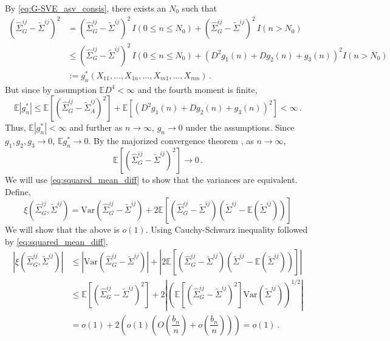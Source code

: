 \documentclass[11pt]{article}
\newcommand{\E}{\mathbb{E}}
\newcommand{\Var}{\text{Var}}
\theoremstyle{remark}
\begin{document}
By \eqref{eq:G-SVE_asv_consis}, there exists an $N_0$ such that
\begin{align*}
\left(\hat{\Sigma}_{G}^{ij} - \tilde{\Sigma}^{ij} \right)^2 &= \left(\hat{\Sigma}_{G}^{ij} - \tilde{\Sigma}^{ij} \right)^2 \, I(0 \leq n \leq N_0) + \left(\hat{\Sigma}_{G}^{ij} - \tilde{\Sigma}^{ij} \right)^2 \, I(n > N_0)\\
& \leq \left(\hat{\Sigma}_{G}^{ij} - \tilde{\Sigma}^{ij} \right)^2 \, I(0 \leq n \leq N_0) +  \left(D^2g_1(n) + Dg_2(n) + g_3(n) \right)^2 I(n > N_0)\\
& := g_n^*(X_{11}, \dots, X_{1n}, \dots, X_{m1}, \dots, X_{mn})\,.
\end{align*}
But since by assumption $\E D^4 <\infty$ and the fourth moment is finite,
\[
\E \left| g_n^* \right| \leq  \E \left[\left(\hat{\Sigma}_{G}^{ij} - \tilde{\Sigma}_{A}^{ij} \right)^2 \right] + \E \left[\left(D^2g_1(n) + Dg_2(n) + g_3(n) \right)^2 \right] < \infty\,.
\]
Thus, $\E \left| g_n^* \right| < \infty$ and further as $n \to \infty$, $g_n \to 0$ under the assumptions. Since $g_1, g_2, g_3 \to 0$, $\E g_n^* \to 0$. By the majorized convergence theorem \citep{zeid:2013}, as $n \to \infty$,
\begin{equation}
\label{eq:squared_mean_diff}
  \E \left[\left(\hat{\Sigma}_{G}^{ij} - \tilde{\Sigma}^{ij} \right)^2 \right] \to 0\,.
\end{equation}
%
We will use \eqref{eq:squared_mean_diff} to show that the variances are equivalent. Define,
\[
\xi\left(\hat{\Sigma}_{G}^{ij}, \tilde{\Sigma}^{ij} \right) = \Var\left(\hat{\Sigma}_{G}^{ij} - \tilde{\Sigma}^{ij} \right) + 2 \E\left[ \left(\hat{\Sigma}_{G}^{ij} -  \tilde{\Sigma}^{ij} \right) \left(\tilde{\Sigma}^{ij}  - \E \left( \tilde{\Sigma}^{ij} \right) \right) \right]
\]
We will show that the above is $o(1)$. Using Cauchy-Schwarz inequality followed by \eqref{eq:squared_mean_diff},
\begin{align*}
\left|  \xi\left(\hat{\Sigma}_{G}^{ij}, \tilde{\Sigma}^{ij} \right) \right| & \leq \left| \Var\left(\hat{\Sigma}_{G}^{ij} -  \tilde{\Sigma}^{ij} \right) \right| + \left| 2 \E\left[ \left(\hat{\Sigma}_{G}^{ij} - \tilde{\Sigma}^{ij} \right) \left(\tilde{\Sigma}^{ij}  - \E \left( \tilde{\Sigma}^{ij} \right) \right) \right]\right| \\ 
& \leq \E\left[\left(\hat{\Sigma}_{G}^{ij} -  \tilde{\Sigma}^{ij} \right)^2 \right] + 2 \left| \left(\E\left[ \left(\hat{\Sigma}_{G}^{ij} - \tilde{\Sigma}^{ij} \right)^2 \right]  \Var\left(\tilde{\Sigma}^{ij}  \right)   \right)^{1/2}\right| \\ 
& = o(1) + 2\left(o(1) \left(O\left( \dfrac{b_n}{n}\right)  + o\left( \dfrac{b_n}{n}\right) \right)  \right) = o(1)\,.
\end{align*}
\end{document}
